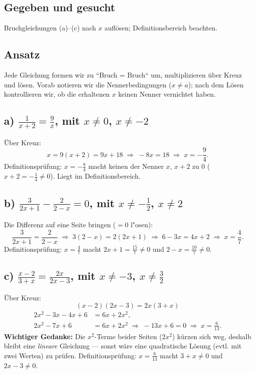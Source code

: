 

\subsection*{Gegeben und gesucht}
Bruchgleichungen (a)--(c) nach $x$ auflösen; Definitionsbereich beachten.

\subsection*{Ansatz}
Jede Gleichung formen wir zu ``Bruch = Bruch`` um, multiplizieren über
Kreuz und lösen. Vorab notieren wir die Nennerbedingungen ($x\ne a$);
nach dem Lösen kontrollieren wir, ob die erhaltenen $x$ keinen Nenner
vernichtet haben.

\subsection*{a) $\frac1{x+2}=\frac9x$, mit $x\neq0$, $x\neq-2$}
Über Kreuz:
\begin{equation}
  x=9(x+2)=9x+18\;\Longrightarrow\;-8x=18\;\Longrightarrow\;x=-\frac94 .
\end{equation}
Definitionsprüfung: $x=-\tfrac94$ macht keinen der Nenner $x$, $x+2$
zu $0$ ($x+2=-\tfrac14\neq0$). Liegt im Definitionsbereich. \checkmark

\subsection*{b) $\frac3{2x+1}-\frac2{2-x}=0$, mit $x\neq-\frac12$, $x\neq2$}
Die Differenz auf eine Seite bringen ($=0$ l"osen):
\begin{equation}
  \frac3{2x+1}=\frac2{2-x}\;\Longrightarrow\;3(2-x)=2(2x+1)
  \;\Longrightarrow\;6-3x=4x+2\;\Longrightarrow\;x=\frac47 .
\end{equation}
Definitionsprüfung: $x=\tfrac47$ macht $2x+1=\tfrac{15}7\neq0$ und
$2-x=\tfrac{10}7\neq0$. \checkmark

\subsection*{c) $\frac{x-2}{3+x}=\frac{2x}{2x-3}$, mit $x\neq-3$, $x\neq\frac32$}
Über Kreuz:
\begin{equation}
  (x-2)(2x-3)=2x(3+x)
\end{equation}
\begin{align}
  2x^2-3x-4x+6&=6x+2x^2, \\
  2x^2-7x+6&=6x+2x^2 \;\Longrightarrow\; -13x+6=0
  \;\Longrightarrow\; x=\frac6{13} .
\end{align}
\textbf{Wichtiger Gedanke:} Die $x^2$-Terme beider Seiten ($2x^2$)
kürzen sich weg, deshalb bleibt eine \emph{lineare} Gleichung ---
sonst wäre eine quadratische Lösung (evtl. mit zwei Werten) zu prüfen.
Definitionsprüfung: $x=\tfrac6{13}$ macht $3+x\neq0$ und
$2x-3\neq0$. \checkmark

